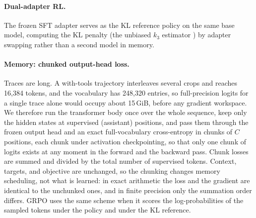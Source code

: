 \paragraph{Dual-adapter RL.}
The frozen SFT adapter serves as the KL reference policy on the same base model, computing the
KL penalty (the unbiased $k_3$ estimator \citep{schulman2025kl}) by adapter swapping rather than a second model in memory.

\paragraph{Memory: chunked output-head loss.}
Traces are long. A with-tools trajectory interleaves several crops and reaches 16{,}384 tokens, and the vocabulary has
248{,}320 entries, so full-precision logits for a single trace alone would occupy about 15\,GiB, before any gradient
workspace. We therefore run the transformer body once over the whole sequence, keep only the hidden states at
supervised (assistant) positions, and pass them through the frozen output head and an exact full-vocabulary
cross-entropy in chunks of $C$ positions, each chunk under activation checkpointing, so that only one chunk of
logits exists at any moment in the forward and the backward pass. Chunk losses are summed and divided by the total
number of supervised tokens. Context, targets, and objective are unchanged, so the chunking changes memory
scheduling, not what is learned: in exact arithmetic the loss and the gradient are identical to the unchunked ones,
and in finite precision only the summation order differs. GRPO uses the same scheme when it scores the log-probabilities
of the sampled tokens under the policy and under the KL reference.
